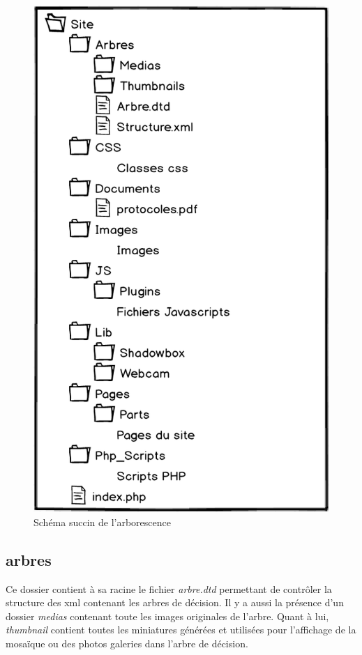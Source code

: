 \documentclass[twoside]{EPURapport}
\begin{document}
	\begin{figure}[hbtp]
			\centering
		\includegraphics[scale=0.6]{images/arborescence.png}
			\caption{Schéma succin de l'arborescence}
		\end{figure}

		\subsection{arbres}
		Ce dossier contient à sa racine le fichier \emph{arbre.dtd} permettant de contrôler la structure des xml contenant les arbres de décision. Il y a aussi la présence d'un dossier \emph{medias} contenant toute les images originales de l'arbre. Quant à lui, \emph{thumbnail} contient toutes les miniatures générées et utilisées pour l'affichage de la mosaïque ou des photos galeries dans l'arbre de décision.
		
\end{document}
